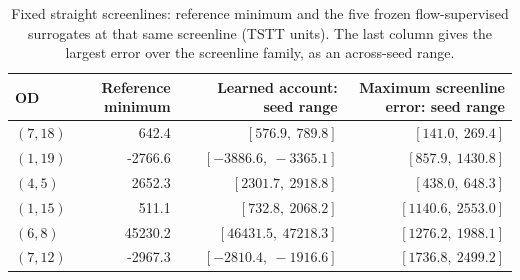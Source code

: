\begin{table}[pos=htbp]
\footnotesize
\caption{Fixed straight screenlines: reference minimum and the five frozen flow-supervised surrogates at that same screenline (TSTT units). The last column gives the largest error over the screenline family, as an across-seed range.}
\label{tab:screenlinelearned}
\small\begin{tabular*}{\tblwidth}{@{\extracolsep{\fill}}lrrr}\toprule
OD & Reference minimum & Learned account: seed range & Maximum screenline error: seed range\\\midrule
$(7,18)$ & 642.4 & $[576.9,\ 789.8]$ & $[141.0,\ 269.4]$ \\
$(1,19)$ & -2766.6 & $[-3886.6,\ -3365.1]$ & $[857.9,\ 1430.8]$ \\
$(4,5)$ & 2652.3 & $[2301.7,\ 2918.8]$ & $[438.0,\ 648.3]$ \\
$(1,15)$ & 511.1 & $[732.8,\ 2068.2]$ & $[1140.6,\ 2553.0]$ \\
$(6,8)$ & 45230.2 & $[46431.5,\ 47218.3]$ & $[1276.2,\ 1988.1]$ \\
$(7,12)$ & -2967.3 & $[-2810.4,\ -1916.6]$ & $[1736.8,\ 2499.2]$ \\
\bottomrule\end{tabular*}\end{table}
